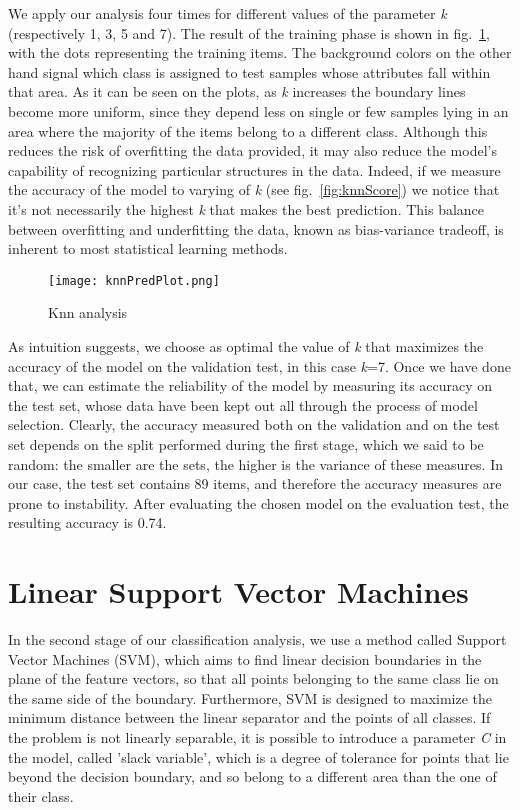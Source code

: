 \documentclass[11pt,twoside,a4paper]{article}
\begin{document}
We apply our analysis four times for different values of the parameter \emph{k} (respectively 1, 3, 5 and 7). The result of the training phase is shown in fig.~\ref{fig:knnPred}, with the dots representing the training items. The background colors on the other hand signal which class is assigned to test samples whose attributes fall within that area. As it can be seen on the plots, as \emph{k} increases the boundary lines become more uniform, since they depend less on single or few samples lying in an area where the majority of the items belong to a different class. Although this reduces the risk of overfitting the data provided, it may also reduce the model's capability of recognizing particular structures in the data.\newline
Indeed, if we measure the accuracy of the model to varying of \emph{k} (see fig.~\ref{fig:knnScore}) we notice that it's not necessarily the highest \emph{k} that makes the best prediction. This balance between overfitting and underfitting the data, known as bias-variance tradeoff, is inherent to most statistical learning methods.

\begin{figure}[!b]
  \begin{center}
  \texttt{[image: knnPredPlot.png]}
  \caption{Knn analysis}
  \label{fig:knnPred}
  \end{center}
\end{figure}

As intuition suggests, we choose as optimal the value of \emph{k} that maximizes the accuracy of the model on the validation test, in this case \emph{k}=7. Once we have done that, we can estimate the reliability of the model by measuring its accuracy on the test set, whose data have been kept out all through the process of model selection. Clearly, the accuracy measured both on the validation and on the test set depends on the split performed during the first stage, which we said to be random: the smaller are the sets, the higher is the variance of these measures. In our case, the test set contains 89 items, and therefore the accuracy measures are prone to instability.\newline
After evaluating the chosen model on the evaluation test, the resulting accuracy is 0.74.


\section{Linear Support Vector Machines}
\label{SVM}
In the second stage of our classification analysis, we use a method called Support Vector Machines (SVM), which aims to find linear decision boundaries in the plane of the feature vectors, so that all points belonging to the same class lie on the same side of the boundary. Furthermore, SVM is designed to maximize the minimum distance between the linear separator and the points of all classes.\newline
If the problem is not linearly separable, it is possible to introduce a parameter \emph{C} in the model, called 'slack variable', which is a degree of tolerance for points that lie beyond the decision boundary, and so belong to a different area than the one of their class.
\end{document}

